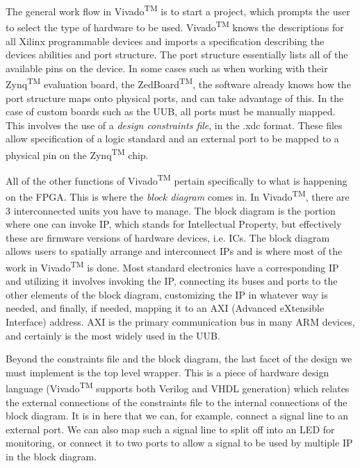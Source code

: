 The general work flow in Vivado\textsuperscript{TM} is to start a project, which prompts the user to select the type of hardware to be used. Vivado\textsuperscript{TM} knows the descriptions for all Xilinx programmable devices and imports a specification describing the devices abilities and port structure. The port structure essentially lists all of the available pins on the device. In some cases such as when working with their Zynq\textsuperscript{TM} evaluation board, the ZedBoard\textsuperscript{TM}, the software already knows how the port structure maps onto physical ports, and can take advantage of this. In the case of custom boards such as the UUB, all ports must be manually mapped. This involves the use of a \textit{design constraints file}, in the .xdc format. These files allow specification of a logic standard and an external port to be mapped to a physical pin on the Zynq\textsuperscript{TM} chip.

All of the other functions of Vivado\textsuperscript{TM} pertain specifically to what is happening on the FPGA. This is where the \textit{block diagram} comes in. In Vivado\textsuperscript{TM}, there are 3 interconnected units you have to manage. The block diagram is the portion where one can invoke IP, which stands for Intellectual Property, but effectively these are firmware versions of hardware devices, i.e. ICs. The block diagram allows users to spatially arrange and interconnect IPs and is where most of the work in Vivado\textsuperscript{TM} is done. Most standard electronics have a corresponding IP and utilizing it involves invoking the IP, connecting its buses and ports to the other elements of the block diagram, customizing the IP in whatever way is needed, and finally, if needed, mapping it to an AXI (Advanced eXtensible Interface) address. AXI is the primary communication bus in many ARM devices, and certainly is the most widely used in the UUB. 

Beyond the constraints file and the block diagram, the last facet of the design we must implement is the top level wrapper. This is a piece of hardware design language (Vivado\textsuperscript{TM} supports both Verilog and VHDL generation) which relates the external connections of the constraints file to the internal connections of the block diagram. It is in here that we can, for example, connect a signal line to an external port. We can also map such a signal line to split off into an LED for monitoring, or connect it to two ports to allow a signal to be used by multiple IP in the block diagram.  


